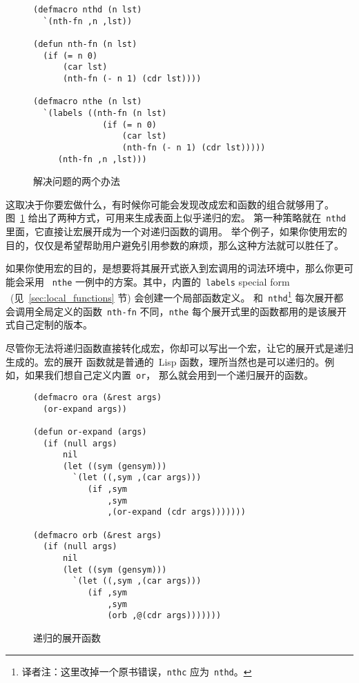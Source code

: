 \begin{figure}
\begin{lstlisting}
(defmacro nthd (n lst)
  `(nth-fn ,n ,lst))

(defun nth-fn (n lst)
  (if (= n 0)
      (car lst)
      (nth-fn (- n 1) (cdr lst))))

(defmacro nthe (n lst)
  `(labels ((nth-fn (n lst)
              (if (= n 0)
                  (car lst)
                  (nth-fn (- n 1) (cdr lst)))))
     (nth-fn ,n ,lst)))
\end{lstlisting}
  \caption{解决问题的两个办法}
  \label{fig:two_ways_to_fix_the_problem}
\end{figure}

这取决于你要宏做什么，有时候你可能会发现改成宏和函数的组合就够用了。
图~\ref{fig:two_ways_to_fix_the_problem} 给出了两种方式，可用来生成表面上似乎递归的宏。
第一种策略就在~\texttt{nthd} 里面，它直接让宏展开成为一个对递归函数的调用。
举个例子，如果你使用宏的目的，仅仅是希望帮助用户避免引用参数的麻烦，那么这种方法就可以胜任了。

如果你使用宏的目的，是想要将其展开式嵌入到宏调用的词法环境中，那么你更可能会采用
~\texttt{nthe} 一例中的方案。其中，内置的~\texttt{labels} special form
~(见~\ref{sec:local_functions} 节) 会创建一个局部函数定义。
和~\texttt{nthd}\footnote{译者注：这里改掉一个原书错误，\texttt{nthc} 应为~\texttt{nthd}。} 每次展开都
会调用全局定义的函数~\texttt{nth-fn} 不同，\texttt{nthe} 每个展开式里的函数都用的是该展开式自己定制的版本。

尽管你无法将递归函数直接转化成宏，你却可以写出一个宏，让它的展开式是递归生成的。宏的展开
函数就是普通的~Lisp 函数，理所当然也是可以递归的。例如，如果我们想自己定义内置~\texttt{or}，
那么就会用到一个递归展开的函数。

\begin{figure}
\begin{lstlisting}
(defmacro ora (&rest args)
  (or-expand args))

(defun or-expand (args)
  (if (null args)
      nil
      (let ((sym (gensym)))
        `(let ((,sym ,(car args)))
           (if ,sym
               ,sym
               ,(or-expand (cdr args)))))))

(defmacro orb (&rest args)
  (if (null args)
      nil
      (let ((sym (gensym)))
        `(let ((,sym ,(car args)))
           (if ,sym
               ,sym
               (orb ,@(cdr args)))))))
\end{lstlisting}
  \caption{递归的展开函数}
  \label{fig:recursive_expansion_functions}
\end{figure}

